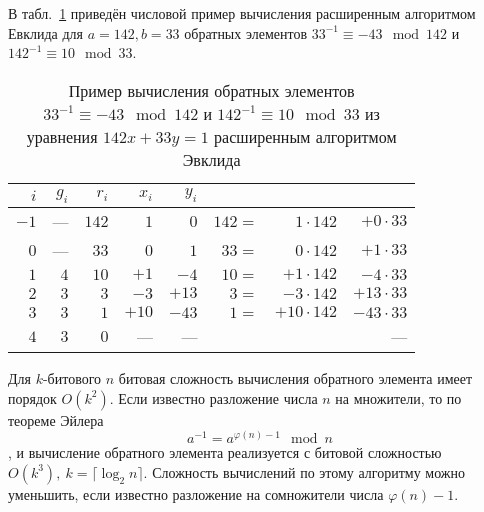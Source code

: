 \example
В табл.~\ref{tab:extended-euclid-inverse} приведён числовой пример вычисления расширенным алгоритмом Евклида для $a=142, b=33$ обратных элементов $33^{-1} \equiv -43 \mod 142$ и $142^{-1} \equiv 10 \mod 33$.

\begin{table}[!ht]
    \centering
    \caption{Пример вычисления обратных элементов $33^{-1} \equiv -43 \mod 142$ и $142^{-1} \equiv 10 \mod 33$ из уравнения $142 x + 33 y = 1$ расширенным алгоритмом Эвклида\label{tab:extended-euclid-inverse}}
    \begin{tabular}{|r|r|r|r|r|rrr|}
        \hline
        $i$ & $g_i$ & $r_i$ & $x_i$ & $y_i$ & & & \\
        \hline
        $-1$ &  --- & $142$ &   $1$ &   $0$ & $142 =$ & $  1 \cdot 142$ & $ + 0 \cdot 33$ \\
	 $0$ &  --- &  $33$ &   $0$ &   $1$ &  $33 =$ & $  0 \cdot 142$ & $ + 1 \cdot 33$ \\
	 $1$ &  $4$ &  $10$ &  $+1$ &  $-4$ &  $10 =$ & $ +1 \cdot 142$ & $ - 4 \cdot 33$ \\
	 $2$ &  $3$ &   $3$ &  $-3$ & $+13$ &   $3 =$ & $ -3 \cdot 142$ & $+ 13 \cdot 33$ \\
	 $3$ &  $3$ &   $1$ & $+10$ & $-43$ &   $1 =$ & $+10 \cdot 142$ & $- 43 \cdot 33$ \\
	 $4$ &  $3$ &   $0$ &   --- &   --- & & & --- \\
        \hline
    \end{tabular}
\end{table}
\exampleend

Для $k$-битового $n$ битовая сложность вычисления обратного элемента имеет порядок $O(k^2)$. Если известно разложение числа $n$ на множители, то по теореме Эйлера
    \[ a^{-1} = a^{\varphi(n) - 1} \mod n \],
и вычисление обратного элемента реализуется с битовой сложностью $O(k^3),~ k = \lceil \log_2 n \rceil$. Сложность вычислений по этому алгоритму можно уменьшить, если известно разложение на сомножители числа $\varphi(n) - 1$.
